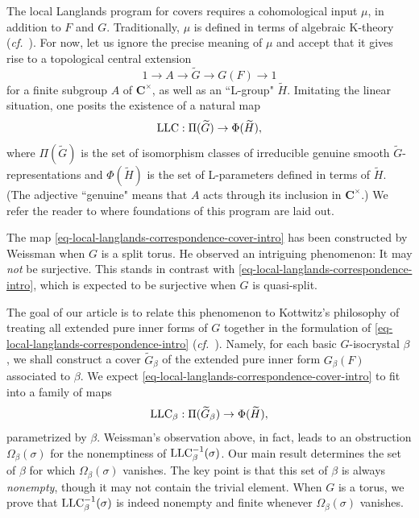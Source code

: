 \documentclass[10pt,english,reqno]{amsart}
\newcommand{\complexes}{\mathbf C}
\newcommand{\LLC}{\textnormal{LLC}}
\theoremstyle{definition}
\numberwithin{equation}{section}
\begin{document}
The local Langlands program for covers requires a cohomological input $\mu$, in addition to $F$ and $G$. Traditionally, $\mu$ is defined in terms of algebraic K-theory (\emph{cf.}~\cite{MR1896177, MR3802418}). For now, let us ignore the precise meaning of $\mu$ and accept that it gives rise to a topological central extension
$$
1 \rightarrow A \rightarrow \widetilde G \rightarrow G(F) \rightarrow 1
$$
for a finite subgroup $A$ of $\complexes^{\times}$, as well as an ``L-group" $\widetilde H$. Imitating the linear situation, one posits the existence of a natural map
\begin{equation}
\label{eq-local-langlands-correspondence-cover-intro}
\LLC : \Pi(\widetilde G) \rightarrow \Phi(\widetilde H),
\end{equation}
where $\Pi(\widetilde G)$ is the set of isomorphism classes of irreducible genuine smooth $\widetilde G$-representations and $\Phi(\widetilde H)$ is the set of L-parameters defined in terms of $\widetilde H$. (The adjective ``genuine" means that $A$ acts through its inclusion in $\complexes^{\times}$.) We refer the reader to \cite{MR3802417, MR3802418, MR3802419} where foundations of this program are laid out.

The map \eqref{eq-local-langlands-correspondence-cover-intro} has been constructed by Weissman when $G$ is a split torus. He observed an intriguing phenomenon: It may \emph{not} be surjective. This stands in contrast with \eqref{eq-local-langlands-correspondence-intro}, which is expected to be surjective when $G$ is quasi-split.



The goal of our article is to relate this phenomenon to Kottwitz's philosophy of treating all extended pure inner forms of $G$ together in the formulation of \eqref{eq-local-langlands-correspondence-intro} (\emph{cf.}~\cite{MR809866, MR1485921, MR3163358}). Namely, for each basic $G$-isocrystal $\beta$, we shall construct a cover $\widetilde G_{\beta}$ of the extended pure inner form $G_{\beta}(F)$ associated to $\beta$. We expect \eqref{eq-local-langlands-correspondence-cover-intro} to fit into a family of maps
\begin{equation}
\label{eq-local-langlands-correspondence-cover-isocrystal-intro}
\LLC_{\beta} : \Pi(\widetilde G_{\beta}) \rightarrow \Phi(\widetilde H),
\end{equation}
parametrized by $\beta$. Weissman's observation above, in fact, leads to an obstruction $\Omega_{\beta}(\sigma)$ for the nonemptiness of $\LLC_{\beta}^{-1}(\sigma)$. Our main result determines the set of $\beta$ for which $\Omega_{\beta}(\sigma)$ vanishes. The key point is that this set of $\beta$ is always \emph{nonempty}, though it may not contain the trivial element. When $G$ is a torus, we prove that $\LLC_{\beta}^{-1}(\sigma)$ is indeed nonempty and finite whenever $\Omega_{\beta}(\sigma)$ vanishes.
\end{document}
